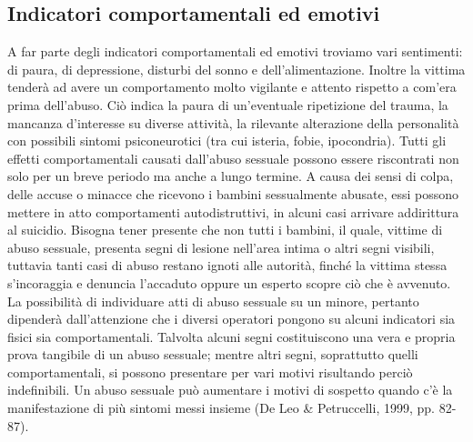 \subsection{Indicatori comportamentali ed emotivi}
A far parte degli indicatori comportamentali ed emotivi troviamo vari sentimenti: di paura, di depressione, disturbi del sonno e dell’alimentazione. Inoltre la vittima tenderà ad avere un comportamento molto vigilante e attento rispetto a com’era prima dell’abuso. Ciò indica la paura di un’eventuale ripetizione del trauma, la mancanza d’interesse su diverse attività, la rilevante alterazione della personalità con possibili sintomi psiconeurotici (tra cui isteria, fobie, ipocondria). Tutti gli effetti comportamentali causati dall’abuso sessuale possono essere riscontrati non solo per un breve periodo ma anche a lungo termine. 
A causa dei sensi di colpa, delle accuse o minacce che ricevono i bambini sessualmente abusate, essi possono mettere in atto comportamenti autodistruttivi, in alcuni casi arrivare addirittura al suicidio. Bisogna tener presente che non tutti i bambini, il quale, vittime di abuso sessuale, presenta segni di lesione nell’area intima o altri segni visibili, tuttavia tanti casi di abuso restano ignoti alle autorità, finché la vittima stessa s’incoraggia e denuncia l’accaduto oppure un esperto scopre ciò che è avvenuto. La possibilità di individuare atti di abuso sessuale su un minore, pertanto dipenderà dall’attenzione che i diversi operatori pongono su alcuni indicatori sia fisici sia comportamentali. Talvolta alcuni segni costituiscono una vera e propria prova tangibile di un abuso sessuale; mentre altri segni, soprattutto quelli comportamentali, si possono presentare per vari motivi risultando perciò indefinibili. Un abuso sessuale può aumentare i motivi di sospetto quando c’è la manifestazione di più sintomi messi insieme (De Leo & Petruccelli, 1999, pp. 82-87). 
